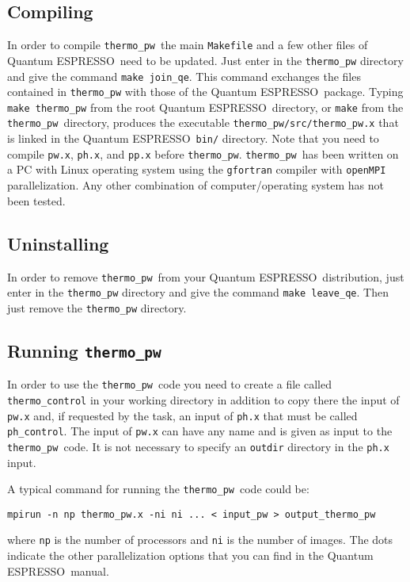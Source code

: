 \documentclass[12pt,a4paper]{article}
\def\qe{{\sc Quantum ESPRESSO}}
\def\thermo{\texttt{thermo\_pw}}
\begin{document}
\subsection{Compiling}

In order to compile \thermo\ the main \texttt{Makefile} and a few other
files of \qe\ need to be updated. Just enter in the \texttt{thermo\_pw}
directory and give the command \texttt{make join\_qe}. This command exchanges
the files contained in \texttt{thermo\_pw} with those of the \qe\ package.
Typing \texttt{make thermo\_pw} from the root \qe\ directory, or \texttt{make} 
from the \texttt{thermo\_pw}\ directory, produces the executable
\texttt{thermo\_pw/src/thermo\_pw.x} that is linked in the 
\qe\ \texttt{bin/} directory. Note that you need to compile \texttt{pw.x},
\texttt{ph.x}, and \texttt{pp.x} before \texttt{thermo\_pw}.
\thermo\ has been written on a PC with Linux operating system using the
\texttt{gfortran} compiler with \texttt{openMPI} parallelization. Any other
combination of computer/operating system has not been tested.

\subsection{Uninstalling}

In order to remove \thermo\ from your \qe\ distribution, just enter in the
\texttt{thermo\_pw} directory and give the command \texttt{make leave\_qe}.
Then just remove the \texttt{thermo\_pw} directory.
   
\subsection{Running \thermo}

In order to use the \thermo\ code you need to create a file called
\texttt{thermo\_control} in your working directory in addition to copy
there the input of \texttt{pw.x} and, if requested by the task, an
input of \texttt{ph.x} that must be called \texttt{ph\_control}.
The input of \texttt{pw.x} can have any name and is given as input to
the \thermo\ code. It is not necessary to specify an \texttt{outdir} 
directory in the \texttt{ph.x} input.

A typical command for running the \thermo\ code could be:
\begin{verbatim}
mpirun -n np thermo_pw.x -ni ni ... < input_pw > output_thermo_pw
\end{verbatim}
where \texttt{np} is the number of processors and \texttt{ni} is the number 
of images. The dots indicate the other parallelization options that
you can find in the \qe\ manual.
\end{document}

